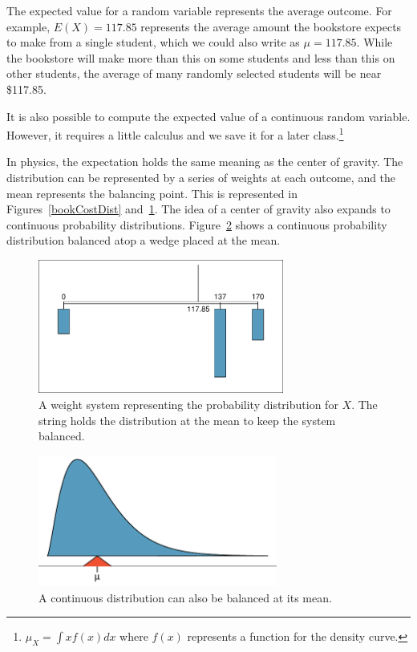 The expected value for a random variable represents the average outcome. For example, $E(X)=117.85$ represents the average amount the bookstore expects to make from a single student, which we could also write as $\mu=117.85$. While the bookstore will make more than this on some students and less than this on other students, the average of many randomly selected students will be near \$117.85.

It is also possible to compute the expected value of a continuous random variable. However, it requires a little calculus and we save it for a later class.\footnote{$\mu_{\scriptscriptstyle{X}} = \int xf(x)dx$ where $f(x)$ represents a function for the density curve.}

In physics, the expectation holds the same meaning as the center of gravity. The distribution can be represented by a series of weights at each outcome, and the mean represents the balancing point. This is represented in Figures~\ref{bookCostDist} and~\ref{bookWts}. The idea of a center of gravity also expands to continuous probability distributions. Figure~\ref{contBalance} shows a continuous probability distribution balanced atop a wedge placed at the mean.

\begin{figure}[h]
\centering
\includegraphics[width=0.72\textwidth]{ch_probability/figures/bookWts/bookWts}
\caption{A weight system representing the probability distribution for $X$. The string holds the distribution at the mean to keep the system balanced.}
\label{bookWts}
\end{figure}

\begin{figure}[h]
\centering
\includegraphics[width=0.7\textwidth]{ch_probability/figures/contBalance/contBalance}
\caption{A continuous distribution can also be balanced at its mean.}
\label{contBalance}
\end{figure}


